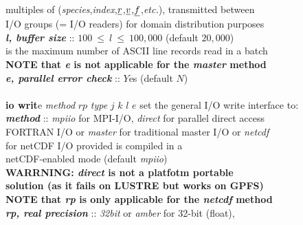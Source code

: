 \begin{tabbing}
\>                                              \> \phantom{xxxx} multiples of ({\em species},{\em index},$\mbox{$\underline{r}$}$,$\mbox{$\underline{v}$}$,$\mbox{$\underline{f}$}$,{\em etc.}), transmitted between \\
\>                                              \> \phantom{xxxx} I/O groups (= I/O readers) for domain distribution purposes \\
\>                                              \> {\bf \em l, buffer size} :: $100~\le~l~\le~100,000$ (default $20,000$) \\
\>                                              \> \phantom{x} is the maximum number of ASCII line records read in a batch \\
\>                                              \> {\bf NOTE that {\em e} is not applicable for the {\em master} method} \\
\>                                              \> \phantom{xxx} {\bf \em e, parallel error check} :: $Y$es (default $N$) \\
\>                                              \> \\
  \> {\bf io writ}e {\em method} $rp$ {\em type} $j$ $k$ $l$ $e$ \> set the general I/O write interface to: \\
\>                                              \> {\bf \em method} :: {\em mpiio} for MPI-I/O, {\em direct} for parallel direct access \\
\>                                              \> \phantom{x} FORTRAN I/O or {\em master} for traditional master I/O or {\em netcdf} \\
\>                                              \> \phantom{x} for netCDF I/O provided \D is compiled in a \\
\>                                              \> \phantom{x} netCDF-enabled mode (default {\em mpiio}) \\
\>                                              \> \phantom{x} {\bf WARRNING: {\em direct} is not a platfotm portable} \\
\>                                              \> \phantom{x} {\bf solution (as it fails on LUSTRE but works on GPFS)} \\
\>                                              \> {\bf NOTE that {\em rp} is only applicable for the {\em netcdf} method} \\
\>                                              \> {\bf \em rp, real precision} :: {\em 32bit} or {\em amber} for 32-bit (float), \\

\end{tabbing}
